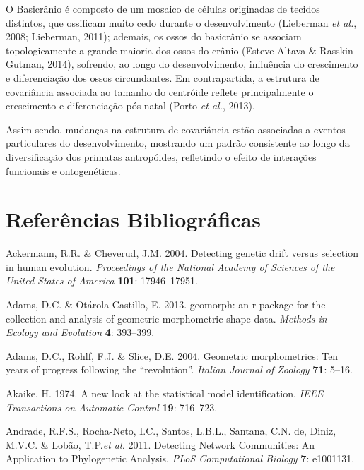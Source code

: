\documentclass[12pt,twoside]{report}
\begin{document}
O Basicrânio é composto de um mosaico de células originadas de tecidos
distintos, que ossificam muito cedo durante o desenvolvimento (Lieberman
\emph{et al.}, 2008; Lieberman, 2011); ademais, os ossos do basicrânio
se associam topologicamente a grande maioria dos ossos do crânio
(Esteve-Altava \& Rasskin-Gutman, 2014), sofrendo, ao longo do
desenvolvimento, influência do crescimento e diferenciação dos ossos
circundantes. Em contrapartida, a estrutura de covariância associada ao
tamanho do centróide reflete principalmente o crescimento e
diferenciação pós-natal (Porto \emph{et al.}, 2013).

Assim sendo, mudanças na estrutura de covariância estão associadas a
eventos particulares do desenvolvimento, mostrando um padrão consistente
ao longo da diversificação dos primatas antropóides, refletindo o efeito
de interações funcionais e ontogenéticas.

\def\sectionautorefname{Seção} \def\chapterautorefname{Capítulo}
\def\figureautorefname{Figura} \def\tableautorefname{Tabela}


\pagestyle{plain}

\chapter*{Referências Bibliográficas}


Ackermann, R.R. \& Cheverud, J.M. 2004. Detecting genetic drift versus
selection in human evolution. \emph{Proceedings of the National Academy
of Sciences of the United States of America} \textbf{101}: 17946--17951.

Adams, D.C. \& Otárola-Castillo, E. 2013. geomorph: an r package for the
collection and analysis of geometric morphometric shape data.
\emph{Methods in Ecology and Evolution} \textbf{4}: 393--399.

Adams, D.C., Rohlf, F.J. \& Slice, D.E. 2004. Geometric morphometrics:
Ten years of progress following the ``revolution''. \emph{Italian
Journal of Zoology} \textbf{71}: 5--16.

Akaike, H. 1974. A new look at the statistical model identification.
\emph{IEEE Transactions on Automatic Control} \textbf{19}: 716--723.

Andrade, R.F.S., Rocha-Neto, I.C., Santos, L.B.L., Santana, C.N. de,
Diniz, M.V.C. \& Lobão, T.P.\emph{et al.} 2011. Detecting Network
Communities: An Application to Phylogenetic Analysis. \emph{PLoS
Computational Biology} \textbf{7}: e1001131.
\end{document}
